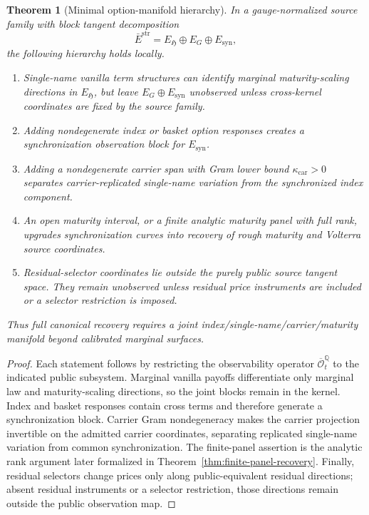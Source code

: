 \documentclass[11pt,a4paper]{amsart}
\theoremstyle{plain}
\newtheorem{theorem}{Theorem}[section]
\theoremstyle{definition}
\theoremstyle{remark}
\newcommand{\QQ}{\mathbb{Q}}
\begin{document}
\begin{theorem}[Minimal option-manifold hierarchy]\label{thm:minimal-manifold-hierarchy}
In a gauge-normalized source family with block tangent decomposition
\[
        \bar E^{\mathrm{str}}=E_{\mathfrak H}\oplus E_G\oplus E_{\mathrm{syn}},
\]
the following hierarchy holds locally.
\begin{enumerate}[leftmargin=2em]
\item Single-name vanilla term structures can identify marginal maturity-scaling directions in
\(E_{\mathfrak H}\), but leave \(E_G\oplus E_{\mathrm{syn}}\) unobserved unless cross-kernel coordinates are
fixed by the source family.
\item Adding nondegenerate index or basket option responses creates a synchronization observation
block for \(E_{\mathrm{syn}}\).
\item Adding a nondegenerate carrier span with Gram lower bound
\(\kappa_{\mathrm{car}}>0\) separates carrier-replicated single-name variation from the
synchronized index component.
\item An open maturity interval, or a finite analytic maturity panel with full rank, upgrades
synchronization curves into recovery of rough maturity and Volterra source coordinates.
\item Residual-selector coordinates lie outside the purely public source tangent space.  They
remain unobserved unless residual price instruments are included or a selector restriction is
imposed.
\end{enumerate}
Thus full canonical recovery requires a joint index/single-name/carrier/maturity manifold beyond
calibrated marginal surfaces.
\end{theorem}

\begin{proof}
Each statement follows by restricting the observability operator
\(\overline{\mathcal O}_t^\QQ\) to the indicated public subsystem.  Marginal vanilla payoffs
differentiate only marginal law and maturity-scaling directions, so the joint blocks remain in
the kernel.  Index and basket responses contain cross terms and therefore generate a
synchronization block.  Carrier Gram nondegeneracy makes the carrier projection invertible on the
admitted carrier coordinates, separating replicated single-name variation from common
synchronization.  The finite-panel assertion is the analytic rank argument later formalized in
Theorem~\ref{thm:finite-panel-recovery}.  Finally, residual selectors change prices only along
public-equivalent residual directions; absent residual instruments or a selector restriction,
those directions remain outside the public observation map.
\end{proof}
\end{document}
